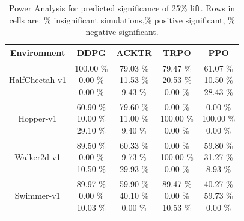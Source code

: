 \begin{table}[H]
    \centering
    \begin{tabular}{|c|c|c|c|c|}
    \hline
         Environment&DDPG&ACKTR&TRPO&PPO  \\
         \hline
         HalfCheetah-v1&\shortstack{100.00 \% \\ 0.00 \% \\ 0.00 \%}&\shortstack{79.03 \%\\11.53 \% \\ 9.43 \%}&\shortstack{79.47 \% \\ 20.53 \% \\ 0.00 \%}&\shortstack{61.07 \% \\ 10.50 \% \\ 28.43 \%}\\
         \hline
         Hopper-v1&\shortstack{60.90 \%\\10.00 \% \\ 29.10 \%}&\shortstack{79.60 \% \\ 11.00 \% \\ 9.40 \%}&\shortstack{0.00 \% \\ 100.00 \% \\ 0.00 \%}&\shortstack{0.00 \% \\ 100.00 \% \\ 0.00 \%}\\
         \hline
         Walker2d-v1&\shortstack{89.50 \%\\0.00 \% \\ 10.50 \%}&\shortstack{60.33 \% \\ 9.73 \% \\ 29.93 \%}&\shortstack{0.00 \% \\ 100.00 \% \\ 0.00 \%}&\shortstack{59.80 \% \\ 31.27 \% \\ 8.93 \%}\\
         \hline
         Swimmer-v1&\shortstack{89.97 \%\\0.00 \% \\ 10.03 \%}&\shortstack{59.90 \% \\ 40.10 \% \\ 0.00 \%}&\shortstack{89.47 \% \\ 0.00 \% \\ 10.53 \%}&\shortstack{40.27 \% \\ 59.73 \% \\ 0.00 \%}\\
         \hline
    \end{tabular}
    \caption{Power Analysis for predicted significance of 25\% lift. Rows in cells are: \% insignificant simulations,\% positive significant, \% negative significant.}
    \label{tab:power}
\end{table}





% 
% 
